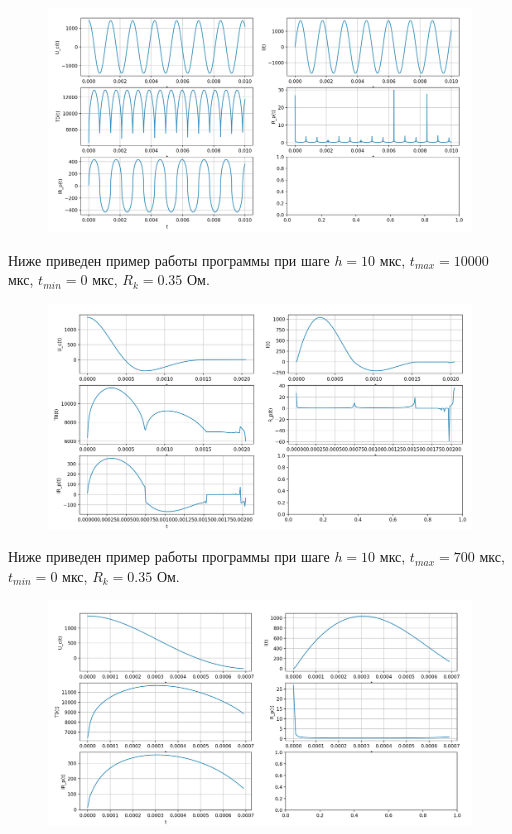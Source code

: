 \documentclass[a4paper,12pt]{article}
\begin{document}
\begin{figure}[h!]
	\begin{center}
		{\includegraphics[scale = 0.2]{RkRp.jpg}}
		\label{RkRp}
	\end{center}
\end{figure}


Ниже приведен пример работы программы при шаге $h = 10$ мкс, $t_{max} = 10000$ мкс, $t_{min} = 0$ мкс, $R_k = 0.35 $ Ом.
\begin{figure}[h!]
	\begin{center}
		{\includegraphics[scale = 0.2]{10000.jpg}}
		\label{10000}
	\end{center}
\end{figure}


\newpage
Ниже приведен пример работы программы при шаге $h = 10$ мкс, $t_{max} = 700$ мкс, $t_{min} = 0$ мкс, $R_k = 0.35 $ Ом.

\begin{figure}[h!]
	\begin{center}
		{\includegraphics[scale = 0.2]{700.jpg}}
		\label{700}
	\end{center}
\end{figure}
\end{document}
